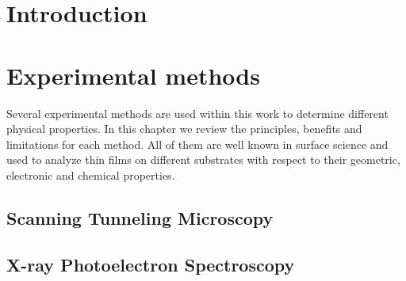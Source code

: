 \documentclass[
twoside,				%
BCOR=8mm,				%
headings=normal,		%
headsepline,			%
footsepline,			%
plainfootsepline,		%
]{scrbook}
\begin{document}

 \frontmatter{}			 														%
 \setcounter{tocdepth}{4}														%
	\tableofcontents{}														 	%
%
\mainmatter{}
\chapter{Introduction}

\chapter{Experimental methods}
Several experimental methods are used within this work to determine different physical properties. In this chapter we review the principles, benefits and limitations for each method. All of them are well known in surface science and used to analyze thin films on different substrates with respect to their geometric, electronic and chemical properties.

  \section{\textbf{S}canning \textbf{T}unneling \textbf{M}icroscopy}
    
  \section{\textbf{X}-ray \textbf{P}hotoelectron \textbf{S}pectroscopy}
	
\end{document}
